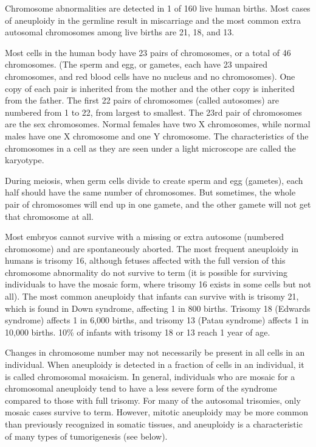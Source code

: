 Chromosome abnormalities are detected in 1 of 160 live human births. Most cases of aneuploidy in the germline result in miscarriage and the most common extra autosomal chromosomes among live births are 21, 18, and 13.

Most cells in the human body have 23 pairs of chromosomes, or a total of 46 chromosomes. (The sperm and egg, or gametes, each have 23 unpaired chromosomes, and red blood cells have no nucleus and no chromosomes). One copy of each pair is inherited from the mother and the other copy is inherited from the father. The first 22 pairs of chromosomes (called autosomes) are numbered from 1 to 22, from largest to smallest. The 23rd pair of chromosomes are the sex chromosomes. Normal females have two X chromosomes, while normal males have one X chromosome and one Y chromosome. The characteristics of the chromosomes in a cell as they are seen under a light microscope are called the karyotype.

During meiosis, when germ cells divide to create sperm and egg (gametes), each half should have the same number of chromosomes. But sometimes, the whole pair of chromosomes will end up in one gamete, and the other gamete will not get that chromosome at all.

Most embryos cannot survive with a missing or extra autosome (numbered chromosome) and are spontaneously aborted. The most frequent aneuploidy in humans is trisomy 16, although fetuses affected with the full version of this chromosome abnormality do not survive to term (it is possible for surviving individuals to have the mosaic form, where trisomy 16 exists in some cells but not all). The most common aneuploidy that infants can survive with is trisomy 21, which is found in Down syndrome, affecting 1 in 800 births. Trisomy 18 (Edwards syndrome) affects 1 in 6,000 births, and trisomy 13 (Patau syndrome) affects 1 in 10,000 births. 10\% of infants with trisomy 18 or 13 reach 1 year of age.

Changes in chromosome number may not necessarily be present in all cells in an individual. When aneuploidy is detected in a fraction of cells in an individual, it is called chromosomal mosaicism. In general, individuals who are mosaic for a chromosomal aneuploidy tend to have a less severe form of the syndrome compared to those with full trisomy. For many of the autosomal trisomies, only mosaic cases survive to term. However, mitotic aneuploidy may be more common than previously recognized in somatic tissues, and aneuploidy is a characteristic of many types of tumorigenesis (see below).

